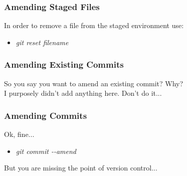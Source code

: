 \begin{frame}
\frametitle{\large Amending Staged Files}
In order to remove a file from the staged environment use:
\begin{itemize}
\item \emph{git reset filename}
\end{itemize}
\end{frame}
\note{}

\begin{frame}
\frametitle{\large Amending Existing Commits}
So you say you want to amend an existing commit? Why? \\
I purposely didn't add anything here. Don't do it...
\end{frame}
\note{}

\begin{frame}
\frametitle{\large Amending Commits}
Ok, fine...
\begin{itemize}
\item \emph{git commit -{}-amend}
\end{itemize}
\vspace{3mm}
But you are missing the point of version control...
\end{frame}
\note{}